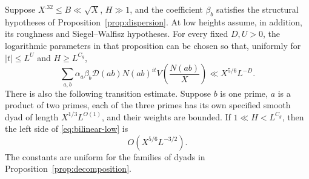 \begin{proposition}
\label{prop:bilinear-low}
Suppose \(X^{.32}\le B\ll\sqrt X\), \(H\gg1\), and the coefficient
\(\beta_b\) satisfies the structural hypotheses of
Proposition~\ref{prop:dispersion}. At low heights assume, in addition,
its roughness and Siegel--Walfisz hypotheses. For every fixed \(D,U>0\),
the logarithmic parameters in that proposition can be chosen so that,
uniformly for \(|t|\le L^U\) and \(H\ge L^{C_g}\),
\begin{equation}
 \sum_{a,b}\alpha_a\beta_b\mathcal D(ab)N(ab)^{it}
                 V\!\left(\frac{N(ab)}X\right)
       \ll X^{5/6}L^{-D}.
 \label{eq:bilinear-low}
\end{equation}
There is also the following transition estimate. Suppose \(b\) is one
prime, \(a\) is a product of two primes, each of the three primes has
its own specified smooth dyad of length \(X^{1/3}L^{O(1)}\), and their
weights are bounded. If \(1\ll H<L^{C_g}\), then the left side of
\eqref{eq:bilinear-low} is
\begin{equation}
 O\!\left(X^{5/6}L^{-3/2}\right).
 \label{eq:bilinear-transition}
\end{equation}
The constants are uniform for the families of dyads in
Proposition~\ref{prop:decomposition}.
\end{proposition}

